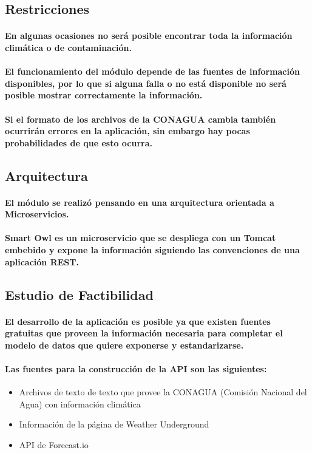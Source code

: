   \subsection{Restricciones}
    \paragraph{En algunas ocasiones no será posible encontrar toda la información climática o de contaminación.}
    \paragraph{El funcionamiento del módulo depende de las fuentes de información disponibles, por lo que si alguna falla o no está disponible no será posible mostrar correctamente la información.}
    \paragraph{Si el formato de los archivos de la CONAGUA cambia también ocurrirán errores en la aplicación, sin embargo hay pocas probabilidades de que esto ocurra.}

  \subsection{Arquitectura}
    \paragraph{El módulo se realizó pensando en una arquitectura orientada a Microservicios.}
    \paragraph{Smart Owl es un microservicio que se despliega con un Tomcat embebido y expone la información siguiendo las convenciones de una aplicación REST.}

  \subsection{Estudio de Factibilidad}
    \paragraph{El desarrollo de la aplicación es posible ya que existen fuentes gratuitas que proveen la información necesaria para completar el modelo de datos que quiere exponerse y estandarizarse.}

    \paragraph{Las fuentes para la construcción de la API son las siguientes:} 
    \begin{itemize}
      \item Archivos de texto de texto que provee la CONAGUA (Comisión Nacional del Agua) con información climática
      \item Información de la página de Weather Underground
      \item API de Forecast.io
    \end{itemize}
    
